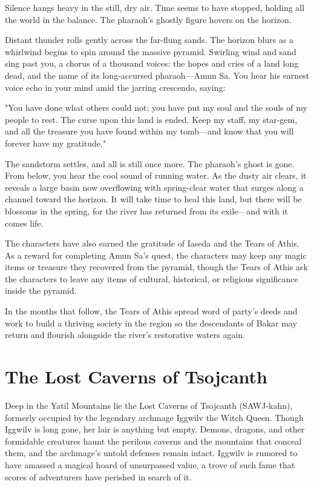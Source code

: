 \documentclass[10pt,a4paper,twoside,bg=print,twocolumn,openany,nodeprecatedcode]{dndbook}
\begin{document}
\begin{DndReadAloud}{}
Silence hangs heavy in the still, dry air. Time seems to have stopped, holding all the world in the balance. The pharaoh's ghostly figure hovers on the horizon.

Distant thunder rolls gently across the far-flung sands. The horizon blurs as a whirlwind begins to spin around the massive pyramid. Swirling wind and sand sing past you, a chorus of a thousand voices: the hopes and cries of a land long dead, and the name of its long-accursed pharaoh—Amun Sa. You hear his earnest voice echo in your mind amid the jarring crescendo, saying:

"You have done what others could not; you have put my soul and the souls of my people to rest. The curse upon this land is ended. Keep my staff, my star-gem, and all the treasure you have found within my tomb—and know that you will forever have my gratitude."

The sandstorm settles, and all is still once more. The pharaoh's ghost is gone. From below, you hear the cool sound of running water. As the dusty air clears, it reveals a large basin now overflowing with spring-clear water that surges along a channel toward the horizon. It will take time to heal this land, but there will be blossoms in the spring, for the river has returned from its exile—and with it comes life.

\end{DndReadAloud}

The characters have also earned the gratitude of Iaseda and the Tears of Athis. As a reward for completing Amun Sa's quest, the characters may keep any magic items or treasure they recovered from the pyramid, though the Tears of Athis ask the characters to leave any items of cultural, historical, or religious significance inside the pyramid.

In the months that follow, the Tears of Athis spread word of party's deeds and work to build a thriving society in the region so the descendants of Bakar may return and flourish alongside the river's restorative waters again.

\chapter{The Lost Caverns of Tsojcanth}
Deep in the Yatil Mountains lie the Lost Caverns of Tsojcanth (SAWJ-kahn), formerly occupied by the legendary archmage Iggwilv the Witch Queen. Though Iggwilv is long gone, her lair is anything but empty. Demons, dragons, and other formidable creatures haunt the perilous caverns and the mountains that conceal them, and the archmage's untold defenses remain intact. Iggwilv is rumored to have amassed a magical hoard of unsurpassed value, a trove of such fame that scores of adventurers have perished in search of it.
\end{document}
